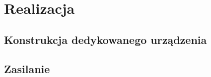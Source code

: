 \newpage %
\section{Realizacja}
\subsection{Konstrukcja dedykowanego urządzenia}
\subsection{Zasilanie}